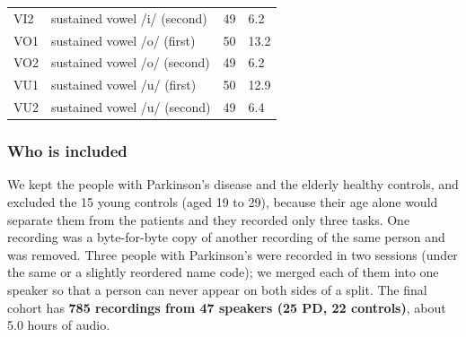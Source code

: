 \documentclass[11pt,a4paper]{article}
\begin{document}
\begin{center}
\begin{longtable}{>{\raggedright\arraybackslash}p{2.07cm}>{\raggedright\arraybackslash}p{8.60cm}>{\raggedleft\arraybackslash}p{2.07cm}>{\raggedleft\arraybackslash}p{2.07cm}}
\hspace{0pt}VI2 & \hspace{0pt}sustained vowel /\allowbreak{}i/\allowbreak{} (second) & \hspace{0pt}49 & \hspace{0pt}6.2\\
\hspace{0pt}VO1 & \hspace{0pt}sustained vowel /\allowbreak{}o/\allowbreak{} (first) & \hspace{0pt}50 & \hspace{0pt}13.2\\
\hspace{0pt}VO2 & \hspace{0pt}sustained vowel /\allowbreak{}o/\allowbreak{} (second) & \hspace{0pt}49 & \hspace{0pt}6.2\\
\hspace{0pt}VU1 & \hspace{0pt}sustained vowel /\allowbreak{}u/\allowbreak{} (first) & \hspace{0pt}50 & \hspace{0pt}12.9\\
\hspace{0pt}VU2 & \hspace{0pt}sustained vowel /\allowbreak{}u/\allowbreak{} (second) & \hspace{0pt}49 & \hspace{0pt}6.4\\
\end{longtable}\end{center}
\subsubsection{Who is included}
We kept the people with Parkinson's disease and the elderly healthy controls, and excluded the 15 young controls (aged 19 to 29), because their age alone would separate them from the patients and they recorded only three tasks. One recording was a byte-for-byte copy of another recording of the same person and was removed. Three people with Parkinson's were recorded in two sessions (under the same or a slightly reordered name code); we merged each of them into one speaker so that a person can never appear on both sides of a split. The final cohort has \textbf{785 recordings from 47 speakers (25 PD, 22 controls)}, about 5.0 hours of audio.
\end{document}
